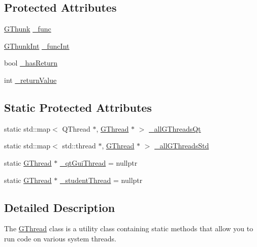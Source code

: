 \subsection*{Protected Attributes}
\begin{DoxyCompactItemize}
\item 
\mbox{\hyperlink{namespacesgl_aa508400d1219d217e0e9509ff59a58f4}{G\+Thunk}} \mbox{\hyperlink{classsgl_1_1GThread_a4fb517a41f3dfeb2294ffc6c35ebbcd5}{\+\_\+func}}
\item 
\mbox{\hyperlink{namespacesgl_a2c46348e6e6dbf761bcceddb93945ac3}{G\+Thunk\+Int}} \mbox{\hyperlink{classsgl_1_1GThread_a78ee15bac1cbfd257b0b430b07275c5d}{\+\_\+func\+Int}}
\item 
bool \mbox{\hyperlink{classsgl_1_1GThread_a0e353607decfc12502e16153af0e23d3}{\+\_\+has\+Return}}
\item 
int \mbox{\hyperlink{classsgl_1_1GThread_a7efc5c426100905390dc33e2f2b39b17}{\+\_\+return\+Value}}
\end{DoxyCompactItemize}
\subsection*{Static Protected Attributes}
\begin{DoxyCompactItemize}
\item 
static std\+::map$<$ Q\+Thread $\ast$, \mbox{\hyperlink{classsgl_1_1GThread}{G\+Thread}} $\ast$ $>$ \mbox{\hyperlink{classsgl_1_1GThread_a70101b45edebc3c3a381ba4e52aca4f7}{\+\_\+all\+G\+Threads\+Qt}}
\item 
static std\+::map$<$ std\+::thread $\ast$, \mbox{\hyperlink{classsgl_1_1GThread}{G\+Thread}} $\ast$ $>$ \mbox{\hyperlink{classsgl_1_1GThread_a55c8fd504abcec8e9e40041df4f82787}{\+\_\+all\+G\+Threads\+Std}}
\item 
static \mbox{\hyperlink{classsgl_1_1GThread}{G\+Thread}} $\ast$ \mbox{\hyperlink{classsgl_1_1GThread_aef7ee9df2bdac5bd63cfb14c7f3e0881}{\+\_\+qt\+Gui\+Thread}} = nullptr
\item 
static \mbox{\hyperlink{classsgl_1_1GThread}{G\+Thread}} $\ast$ \mbox{\hyperlink{classsgl_1_1GThread_a750c577447f70d13a43a12ec37db86d5}{\+\_\+student\+Thread}} = nullptr
\end{DoxyCompactItemize}


\subsection{Detailed Description}
The \mbox{\hyperlink{classsgl_1_1GThread}{G\+Thread}} class is a utility class containing static methods that allow you to run code on various system threads. 

